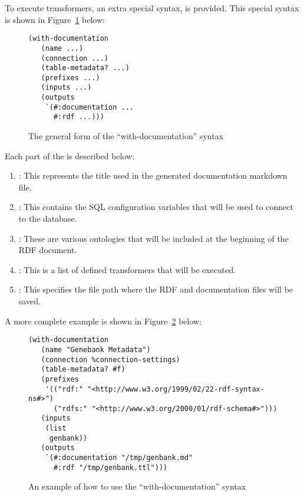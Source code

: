 To execute transformers, an extra special syntax,  is provided.  This special syntax is shown in Figure~\ref{code:with-documentation-syntax} below:

\begin{figure}[H]
\centering
\begin{verbatim}
(with-documentation
   (name ...)
   (connection ...)
   (table-metadata? ...)
   (prefixes ...)
   (inputs ...)
   (outputs
    `(#:documentation ...
      #:rdf ...)))
\end{verbatim}
\caption{The general form of the ``with-documentation'' syntax}\label{code:with-documentation-syntax}
\end{figure}

Each part of the  is described below:

\begin{enumerate}
\item {}: This represents the title used in the generated documentation markdown file.
\item {}: This contains the SQL configuration variables that will be used to connect to the database.
\item {}: These are various ontologies that will be included at the beginning of the RDF document.
\item {}: This is a list of defined transformers that will be executed.
\item {}: This specifies the file path where the RDF and documentation files will be saved.
\end{enumerate}

A more complete example is shown in Figure~\ref{code:with-documentation-example} below:

\begin{figure}[H]
\centering
\begin{verbatim}
(with-documentation
   (name "Genebank Metadata")
   (connection %connection-settings)
   (table-metadata? #f)
   (prefixes
    '(("rdf:" "<http://www.w3.org/1999/02/22-rdf-syntax-ns#>")
      ("rdfs:" "<http://www.w3.org/2000/01/rdf-schema#>")))
   (inputs
    (list
     genbank))
   (outputs
    `(#:documentation "/tmp/genbank.md"
      #:rdf "/tmp/genbank.ttl")))
\end{verbatim}
\caption{An example of how to use the ``with-documentation'' syntax}\label{code:with-documentation-example}
\end{figure}

